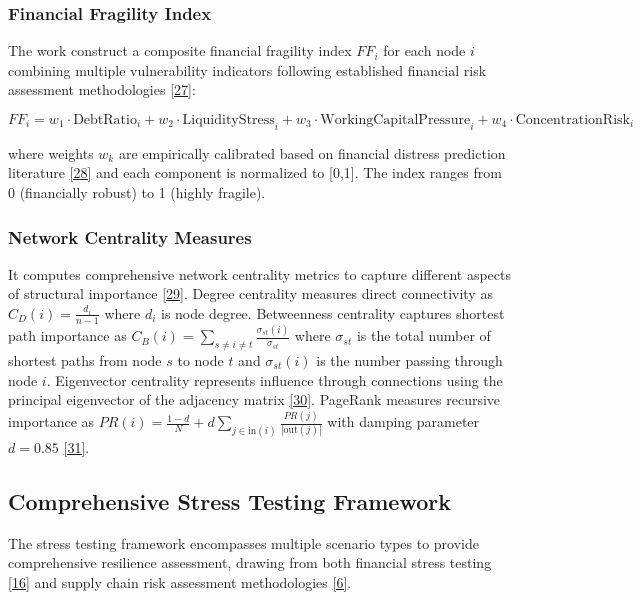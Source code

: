 \documentclass[a4 paper, 11pt,twoside]{article}
\newcommand{\0}{\Bf{0}}
\theoremstyle{definition}
\begin{document}
\subsubsection{Financial Fragility Index}

The work construct a composite financial fragility index $FF_i$ for each node $i$ combining multiple vulnerability indicators following established financial risk assessment methodologies \hyperref[ref27]{[27]}:

\begin{equation}
FF_i = w_1 \cdot \text{DebtRatio}_i + w_2 \cdot \text{LiquidityStress}_i + w_3 \cdot \text{WorkingCapitalPressure}_i + w_4 \cdot \text{ConcentrationRisk}_i
\end{equation}

where weights $w_k$ are empirically calibrated based on financial distress prediction literature \hyperref[ref28]{[28]} and each component is normalized to [0,1]. The index ranges from 0 (financially robust) to 1 (highly fragile).

\subsubsection{Network Centrality Measures}

It computes comprehensive network centrality metrics to capture different aspects of structural importance \hyperref[ref29]{[29]}. Degree centrality measures direct connectivity as $C_D(i) = \frac{d_i}{n-1}$ where $d_i$ is node degree. Betweenness centrality captures shortest path importance as $C_B(i) = \sum_{s \neq i \neq t} \frac{\sigma_{st}(i)}{\sigma_{st}}$ where $\sigma_{st}$ is the total number of shortest paths from node $s$ to node $t$ and $\sigma_{st}(i)$ is the number passing through node $i$. Eigenvector centrality represents influence through connections using the principal eigenvector of the adjacency matrix \hyperref[ref30]{[30]}. PageRank measures recursive importance as $PR(i) = \frac{1-d}{N} + d \sum_{j \in \text{in}(i)} \frac{PR(j)}{|\text{out}(j)|}$ with damping parameter $d=0.85$ \hyperref[ref31]{[31]}.

\subsection{Comprehensive Stress Testing Framework}

The stress testing framework encompasses multiple scenario types to provide comprehensive resilience assessment, drawing from both financial stress testing \hyperref[ref16]{[16]} and supply chain risk assessment methodologies \hyperref[ref6]{[6]}.
\end{document}
